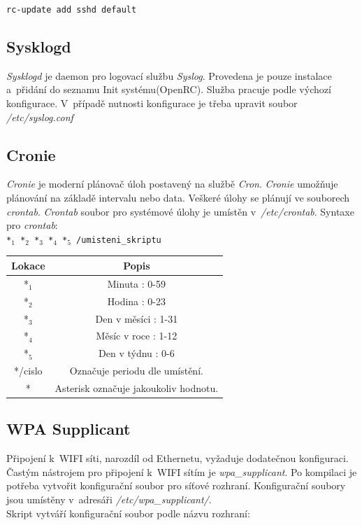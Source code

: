 \documentclass[12pt,a4paper,twoside,]{article}
\begin{document}
{{{{{{\texttt{rc-update add sshd default}
\subsection{\textsf{Sysklogd}} 
\textit{Sysklogd} je daemon pro logovací službu \textit{Syslog}. Provedena je pouze instalace a~přidání do seznamu Init systému(OpenRC). Služba pracuje podle výchozí konfigurace. V~případě nutnosti konfigurace je třeba upravit soubor \textit{/etc/syslog.conf}

\subsection{\textsf{Cronie}}

\textit{Cronie} je moderní plánovač úloh postavený na službě \textit{Cron}. \textit{Cronie} umožňuje plánování na základě intervalu nebo data. Veškeré úlohy se plánují ve souborech \textit{crontab}. \textit{Crontab} soubor pro systémové úlohy je umístěn v~\textit{/etc/crontab}. Syntaxe pro \textit{crontab}:\\

\texttt{*$_{1}$ *$_{2}$ *$_{3}$ *$_{4}$ *$_{5}$ /umisteni\_skriptu}

\begin{table}[h]
	\centering
	\begin{tabular}{|c|c|}
		\hline 
		Lokace&Popis \\
		\hline
		*$_{1}$&  Minuta : 0-59 \\
		\hline
		*$_{2}$&  Hodina : 0-23 \\
		\hline
		*$_{3}$&  Den v měsíci : 1-31 \\
		\hline
		*$_{4}$&  Měsíc v roce : 1-12 \\
		\hline
		*$_{5}$&  Den v týdnu : 0-6 \\
		\hline
		*/cislo&  Označuje periodu dle umístění. \\
		\hline
		*&  Asterisk označuje jakoukoliv hodnotu. \\
		\hline
	\end{tabular}

\end{table}
\subsection{\textsf{WPA Supplicant}}
Připojení k~WIFI síti, narozdíl od Ethernetu, vyžaduje dodatečnou konfiguraci. Častým nástrojem pro připojení k~WIFI sítím je \textit{wpa\_supplicant}. Po kompilaci je potřeba vytvořit konfigurační soubor pro síťové rozhraní. Konfigurační soubory jsou umístěny v~adresáři \textit{/etc/wpa\_supplicant/}.\\ Skript vytváří konfigurační soubor podle názvu rozhraní:\\

}}}}}}
\end{document}
